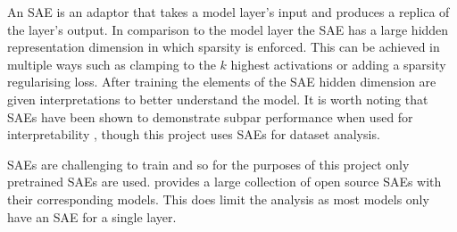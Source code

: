 An SAE is an adaptor that takes a model layer's input and produces a replica of the layer's output.
In comparison to the model layer the SAE has a large hidden representation dimension in which sparsity is enforced.
This can be achieved in multiple ways such as clamping to the $k$ highest activations \citep{k-sparsity} or adding a sparsity regularising loss.
After training the elements of the SAE hidden dimension are given interpretations to better understand the model.
It is worth noting that SAEs have been shown to demonstrate subpar performance when used for interpretability \citep{saes-bad}, though this project uses SAEs for dataset analysis.

SAEs are challenging to train and so for the purposes of this project only pretrained SAEs are used.
\citet{saelens} provides a large collection of open source SAEs with their corresponding models.
This does limit the analysis as most models only have an SAE for a single layer.
